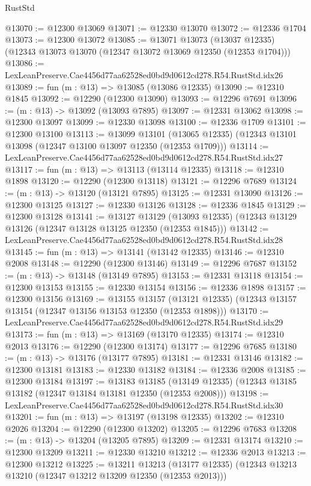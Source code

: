 \begin{lexlean}{RustStd}
\begin{coremodule}
@13070 := @12300 @13069
@13071 := @12330 @13070
@13072 := @12336 @1704
@13073 := @12300 @13072
@13085 := @13071
    @13073
    (@13037 @12335)
    (@12343 @13073 @13070 (@12347 @13072 @13069 @12350 (@12353 @1704)))
@13086 := LexLeanPreserve.Cae4456d77aa62528ed0bd9d0612cd278.R54.RustStd.idx26
@13089 := fun (m : @13) => @13085 (@13086 @12335)
@13090 := @12310 @1845
@13092 := @12290 (@12300 @13090)
@13093 := @12296 @7691
@13096 := (m : @13) -> @13092 (@13093 @7895)
@13097 := @12331 @13062
@13098 := @12300 @13097
@13099 := @12330 @13098
@13100 := @12336 @1709
@13101 := @12300 @13100
@13113 := @13099
    @13101
    (@13065 @12335)
    (@12343 @13101 @13098 (@12347 @13100 @13097 @12350 (@12353 @1709)))
@13114 := LexLeanPreserve.Cae4456d77aa62528ed0bd9d0612cd278.R54.RustStd.idx27
@13117 := fun (m : @13) => @13113 (@13114 @12335)
@13118 := @12310 @1898
@13120 := @12290 (@12300 @13118)
@13121 := @12296 @7689
@13124 := (m : @13) -> @13120 (@13121 @7895)
@13125 := @12331 @13090
@13126 := @12300 @13125
@13127 := @12330 @13126
@13128 := @12336 @1845
@13129 := @12300 @13128
@13141 := @13127
    @13129
    (@13093 @12335)
    (@12343 @13129 @13126 (@12347 @13128 @13125 @12350 (@12353 @1845)))
@13142 := LexLeanPreserve.Cae4456d77aa62528ed0bd9d0612cd278.R54.RustStd.idx28
@13145 := fun (m : @13) => @13141 (@13142 @12335)
@13146 := @12310 @2008
@13148 := @12290 (@12300 @13146)
@13149 := @12296 @7687
@13152 := (m : @13) -> @13148 (@13149 @7895)
@13153 := @12331 @13118
@13154 := @12300 @13153
@13155 := @12330 @13154
@13156 := @12336 @1898
@13157 := @12300 @13156
@13169 := @13155
    @13157
    (@13121 @12335)
    (@12343 @13157 @13154 (@12347 @13156 @13153 @12350 (@12353 @1898)))
@13170 := LexLeanPreserve.Cae4456d77aa62528ed0bd9d0612cd278.R54.RustStd.idx29
@13173 := fun (m : @13) => @13169 (@13170 @12335)
@13174 := @12310 @2013
@13176 := @12290 (@12300 @13174)
@13177 := @12296 @7685
@13180 := (m : @13) -> @13176 (@13177 @7895)
@13181 := @12331 @13146
@13182 := @12300 @13181
@13183 := @12330 @13182
@13184 := @12336 @2008
@13185 := @12300 @13184
@13197 := @13183
    @13185
    (@13149 @12335)
    (@12343 @13185 @13182 (@12347 @13184 @13181 @12350 (@12353 @2008)))
@13198 := LexLeanPreserve.Cae4456d77aa62528ed0bd9d0612cd278.R54.RustStd.idx30
@13201 := fun (m : @13) => @13197 (@13198 @12335)
@13202 := @12310 @2026
@13204 := @12290 (@12300 @13202)
@13205 := @12296 @7683
@13208 := (m : @13) -> @13204 (@13205 @7895)
@13209 := @12331 @13174
@13210 := @12300 @13209
@13211 := @12330 @13210
@13212 := @12336 @2013
@13213 := @12300 @13212
@13225 := @13211
    @13213
    (@13177 @12335)
    (@12343 @13213 @13210 (@12347 @13212 @13209 @12350 (@12353 @2013)))

\end{coremodule}
\end{lexlean}
